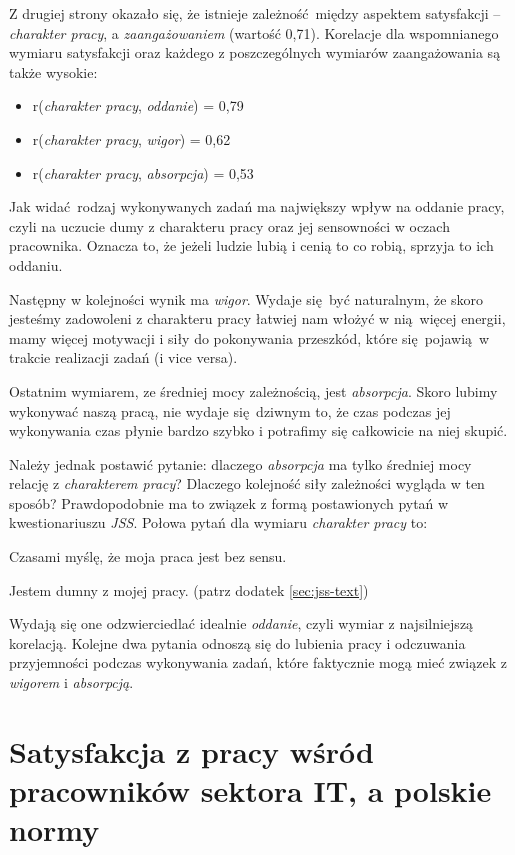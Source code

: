Z drugiej strony okazało się, że istnieje zależność między aspektem satysfakcji --\textit{charakter pracy}, a \textit{zaangażowaniem} (wartość 0,71). Korelacje dla wspomnianego wymiaru satysfakcji oraz każdego z poszczególnych wymiarów zaangażowania są także wysokie:
\begin{itemize}
  \item r(\textit{charakter pracy}, \textit{oddanie}) = 0,79
  \item r(\textit{charakter pracy}, \textit{wigor}) = 0,62
  \item r(\textit{charakter pracy}, \textit{absorpcja}) = 0,53
\end{itemize}
Jak widać rodzaj wykonywanych zadań ma największy wpływ na oddanie pracy, czyli na uczucie dumy z charakteru pracy oraz jej sensowności w oczach pracownika. Oznacza to, że jeżeli ludzie lubią i cenią to co robią, sprzyja to ich oddaniu. 

Następny w kolejności wynik ma \textit{wigor}. Wydaje się być naturalnym, że skoro jesteśmy zadowoleni z charakteru pracy łatwiej nam włożyć w nią więcej energii, mamy więcej motywacji i siły do pokonywania przeszkód, które się pojawią w trakcie
realizacji zadań (i vice versa). 

Ostatnim wymiarem, ze średniej mocy zależnością, jest \textit{absorpcja}. Skoro lubimy wykonywać naszą pracą, nie wydaje się dziwnym to, że czas podczas jej wykonywania czas płynie bardzo szybko i potrafimy się całkowicie na niej skupić. 

Należy jednak postawić pytanie: dlaczego \textit{absorpcja} ma tylko średniej mocy relację z \textit{charakterem pracy}? Dlaczego kolejność siły zależności wygląda w ten sposób? Prawdopodobnie ma to związek z formą postawionych pytań w kwestionariuszu \emph{JSS}. Połowa pytań dla wymiaru \textit{charakter pracy} to:
\begin{iquote}
  Czasami myślę, że moja praca jest bez sensu.
\end{iquote}
\begin{iquote}
  Jestem dumny z mojej pracy. (patrz dodatek \ref{sec:jss-text})
\end{iquote}
Wydają się one odzwierciedlać idealnie \textit{oddanie}, czyli wymiar z najsilniejszą korelacją. Kolejne dwa pytania odnoszą się do lubienia pracy i odczuwania przyjemności podczas wykonywania zadań, które faktycznie mogą mieć związek z \textit{wigorem} i \textit{absorpcją}.


\section{Satysfakcja z pracy wśród pracowników sektora IT, a polskie normy}
